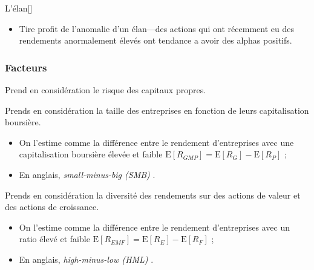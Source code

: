 \documentclass[10pt, french]{article}
\begin{document}
\begin{multicols*}{2}
\begin{definitionGENERAL}{L'élan}[]
\begin{itemize}
	\item	Tire profit de l'anomalie d'un élan---des actions qui ont récemment eu des rendements anormalement élevés ont tendance a avoir des alphas positifs.
\end{itemize}
\end{definitionGENERAL}


\subsubsection{Facteurs}
\begin{definitionNOHFILLsub}
Prend en considération le risque des capitaux propres.	

\end{definitionNOHFILLsub}

\begin{definitionNOHFILLsub}
Prends en considération la taille des entreprises en fonction de leurs capitalisation boursière.	\\

\begin{itemize}
	\item	On l'estime comme la différence entre le rendement d'entreprises avec une capitalisation boursière élevée et faible $\text{E}[R_{GMP}]	=	\text{E}[R_{G}]	-	\text{E}[R_{P}]$ ;
	\item	En anglais, \og \textit{small-minus-big (SMB)} \fg{}.
\end{itemize}
\end{definitionNOHFILLsub}

\begin{definitionNOHFILLsub}
Prends en considération la diversité des rendements sur des actions de valeur et des actions de croissance.	\\

\begin{itemize}
	\item	On l'estime comme la différence entre le rendement d'entreprises avec un ratio élevé et faible $\text{E}[R_{EMF}]	=	\text{E}[R_{E}]	-	\text{E}[R_{F}]$ ;
	\item	En anglais, \og \textit{high-minus-low (HML)} \fg{}.
\end{itemize}
\end{definitionNOHFILLsub}


\end{multicols*}
\end{document}
